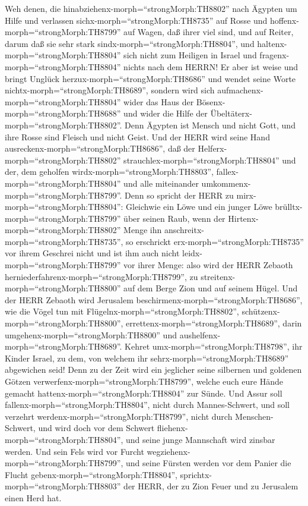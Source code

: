 Weh denen, die hinabziehenx-morph=``strongMorph:TH8802''
nach Ägypten um Hilfe und verlassen sichx-morph=``strongMorph:TH8735''
auf Rosse und hoffenx-morph=``strongMorph:TH8799'' auf Wagen, daß ihrer
viel sind, und auf Reiter, darum daß sie sehr stark
sindx-morph=``strongMorph:TH8804'', und
haltenx-morph=``strongMorph:TH8804'' sich nicht zum Heiligen in Israel
und fragenx-morph=``strongMorph:TH8804'' nichts nach dem HERRN!
 Er aber ist weise und bringt Unglück
herzux-morph=``strongMorph:TH8686'' und wendet seine Worte
nichtx-morph=``strongMorph:TH8689'', sondern wird sich
aufmachenx-morph=``strongMorph:TH8804'' wider das Haus der
Bösenx-morph=``strongMorph:TH8688'' und wider die Hilfe der
Übeltäterx-morph=``strongMorph:TH8802''.  Denn Ägypten ist
Mensch und nicht Gott, und ihre Rosse sind Fleisch und nicht Geist. Und
der HERR wird seine Hand ausreckenx-morph=``strongMorph:TH8686'', daß
der Helferx-morph=``strongMorph:TH8802''
strauchlex-morph=``strongMorph:TH8804'' und der, dem geholfen
wirdx-morph=``strongMorph:TH8803'', fallex-morph=``strongMorph:TH8804''
und alle miteinander umkommenx-morph=``strongMorph:TH8799''.
 Denn so spricht der HERR zu
mirx-morph=``strongMorph:TH8804'': Gleichwie ein Löwe und ein junger
Löwe brülltx-morph=``strongMorph:TH8799'' über seinen Raub, wenn der
Hirtenx-morph=``strongMorph:TH8802'' Menge ihn
anschreitx-morph=``strongMorph:TH8735'', so erschrickt
erx-morph=``strongMorph:TH8735'' vor ihrem Geschrei nicht und ist ihm
auch nicht leidx-morph=``strongMorph:TH8799'' vor ihrer Menge: also wird
der HERR Zebaoth herniederfahrenx-morph=``strongMorph:TH8799'', zu
streitenx-morph=``strongMorph:TH8800'' auf dem Berge Zion und auf seinem
Hügel.  Und der HERR Zebaoth wird Jerusalem
beschirmenx-morph=``strongMorph:TH8686'', wie die Vögel tun mit
Flügelnx-morph=``strongMorph:TH8802'',
schützenx-morph=``strongMorph:TH8800'',
errettenx-morph=``strongMorph:TH8689'', darin
umgehenx-morph=``strongMorph:TH8800'' und
aushelfenx-morph=``strongMorph:TH8689''.  Kehret
umx-morph=``strongMorph:TH8798'', ihr Kinder Israel, zu dem, von welchem
ihr sehrx-morph=``strongMorph:TH8689'' abgewichen seid! 
Denn zu der Zeit wird ein jeglicher seine silbernen und goldenen Götzen
verwerfenx-morph=``strongMorph:TH8799'', welche euch eure Hände gemacht
hattenx-morph=``strongMorph:TH8804'' zur Sünde.  Und Assur
soll fallenx-morph=``strongMorph:TH8804'', nicht durch Mannes-Schwert,
und soll verzehrt werdenx-morph=``strongMorph:TH8799'', nicht durch
Menschen-Schwert, und wird doch vor dem Schwert
fliehenx-morph=``strongMorph:TH8804'', und seine junge Mannschaft wird
zinsbar werden.  Und sein Fels wird vor Furcht
wegziehenx-morph=``strongMorph:TH8799'', und seine Fürsten werden vor
dem Panier die Flucht gebenx-morph=``strongMorph:TH8804'',
sprichtx-morph=``strongMorph:TH8803'' der HERR, der zu Zion Feuer und zu
Jerusalem einen Herd hat.

